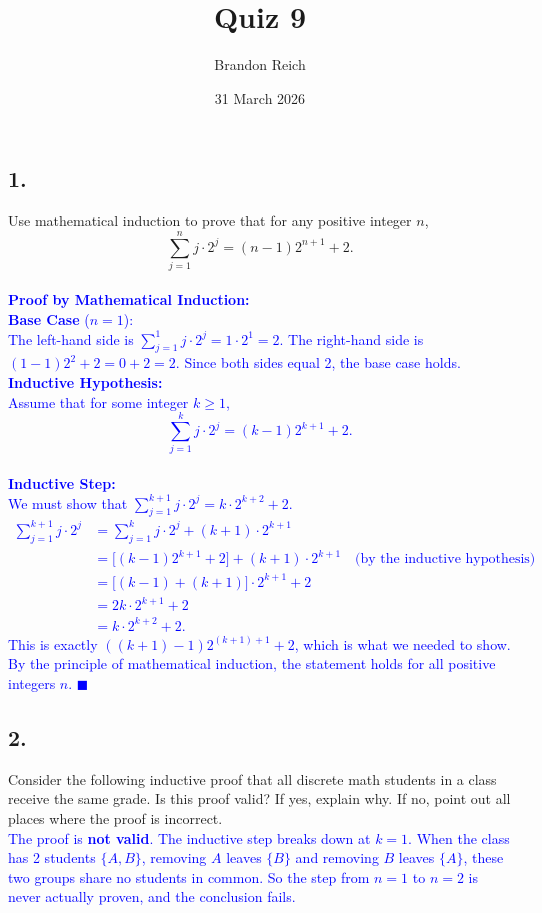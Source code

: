 \documentclass{article}
\title{Quiz 9}
\author{Brandon Reich}
\date{31 March 2026}
\begin{document}
\maketitle

\subsection*{1.}
Use mathematical induction to prove that for any positive integer $n$,
\[
\sum_{j=1}^{n} j \cdot 2^j = (n-1)2^{n+1} + 2.
\] \\[0.5em]
\textcolor{blue}{\textbf{Proof by Mathematical Induction:}} \\[0.5em]
\textcolor{blue}{\textbf{Base Case} ($n = 1$):} \\[0.3em]
\textcolor{blue}{
The left-hand side is $\displaystyle\sum_{j=1}^{1} j \cdot 2^j = 1 \cdot 2^1 = 2$.
The right-hand side is $(1-1)2^{2} + 2 = 0 + 2 = 2$.
Since both sides equal 2, the base case holds.
} \\[0.5em]
\textcolor{blue}{\textbf{Inductive Hypothesis:}} \\[0.3em]
\textcolor{blue}{
Assume that for some integer $k \geq 1$,
\[
\sum_{j=1}^{k} j \cdot 2^j = (k-1)2^{k+1} + 2.
\]
} \\[0.3em]
\textcolor{blue}{\textbf{Inductive Step:}} \\[0.3em]
\textcolor{blue}{
We must show that $\displaystyle\sum_{j=1}^{k+1} j \cdot 2^j = k \cdot 2^{k+2} + 2$.
\begin{align*}
\sum_{j=1}^{k+1} j \cdot 2^j
&= \sum_{j=1}^{k} j \cdot 2^j + (k+1) \cdot 2^{k+1} \\
&= \bigl[(k-1)2^{k+1} + 2\bigr] + (k+1) \cdot 2^{k+1} \quad \text{(by the inductive hypothesis)} \\
&= \bigl[(k-1) + (k+1)\bigr] \cdot 2^{k+1} + 2 \\
&= 2k \cdot 2^{k+1} + 2 \\
&= k \cdot 2^{k+2} + 2.
\end{align*}
This is exactly $((k+1)-1)2^{(k+1)+1} + 2$, which is what we needed to show.
} \\[0.3em]
\textcolor{blue}{
By the principle of mathematical induction, the statement holds for all positive integers $n$. $\blacksquare$
}

\subsection*{2.}
Consider the following inductive proof that all discrete math students in a class receive the same grade. Is this proof valid? If yes, explain why. If no, point out all places where the proof is incorrect. \\[1em]
\textcolor{blue}{
The proof is \textbf{not valid}. The inductive step breaks down at $k = 1$. When the class has 2 students $\{A, B\}$, removing $A$ leaves $\{B\}$ and removing $B$ leaves $\{A\}$, these two groups share no students in common. So the step from $n = 1$ to $n = 2$ is never actually proven, and the conclusion fails.
} \\[0.3em]
\end{document}
